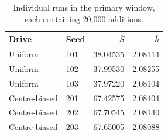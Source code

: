 \begin{table}[htbp]
\centering
\caption{Individual runs in the primary window, each containing 20,000 additions.}
\label{tab:runs}
\begin{tabular}{@{}llrr@{}}
\toprule
Drive & Seed & $\overline S$ & $\overline h$\\
\midrule
Uniform & 101 & 38.04535 & 2.08114\\
Uniform & 102 & 37.99530 & 2.08255\\
Uniform & 103 & 37.97220 & 2.08104\\
Centre-biased & 201 & 67.42575 & 2.08404\\
Centre-biased & 202 & 67.70545 & 2.08140\\
Centre-biased & 203 & 67.65005 & 2.08088\\
\bottomrule
\end{tabular}
\end{table}
